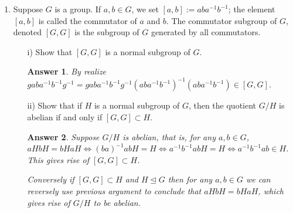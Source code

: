 \documentclass[11pt,leqno]{article}
\newcommand{\<}[1]{{\langle}#1 {\rangle}}
\theoremstyle{plain}
\newtheorem*{answer*}{Answer}
\theoremstyle{definition}
\theoremstyle{remark}
\numberwithin{equation}{section}
\begin{document}
\begin{enumerate}
    
\item Suppose $G$ is a group.  If $a,b \in G$, we set $[a,b] := aba^{-1}b^{-1}$; the element $[a,b]$ is called the commutator of $a$ and $b$.  The commutator subgroup of $G$, denoted $[G,G]$ is the subgroup of $G$ generated by all commutators.
    \begin{itemize}
    \item[i)] Show that $[G,G]$ is a normal subgroup of $G$.
        \begin{answer*}
        By realize $gaba^{-1}b^{-1}g^{-1}=gaba^{-1}b^{-1}g^{-1}(aba^{-1}b^{-1})^{-1}(aba^{-1}b^{-1})\in [G,G]$.
        \end{answer*}
    \item[ii)] Show that if $H$ is a normal subgroup of $G$, then the quotient $G/H$ is abelian if and only if $[G,G] \subset H$.
        \begin{answer*}
        Suppose $G/H$ is abelian, that is, for any $a,b \in G$, $aHbH=bHaH \iff (ba)^{-1}abH=H \iff a^{-1}b^{-1}abH=H \iff a^{-1}b^{-1}ab \in H$. This gives rise of $[G,G]\subset H$. 
        
        Conversely if $[G,G]\subset H$ and $H \trianglelefteq G$ then for any $a,b \in G$ we can reversely use previous argument to conclude that $aHbH=bHaH$, which gives rise of $G/H$ to be abelian. 
        \end{answer*}
    \end{itemize}
    
    \phantom \\
    \phantom \\
    \phantom \\
    \phantom \\
    \phantom \\
    \phantom \\


\end{enumerate}
\end{document}

